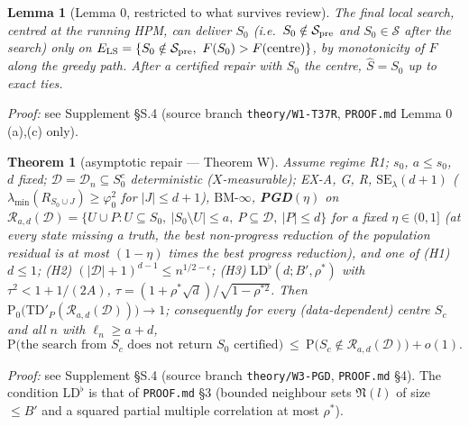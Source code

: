 \documentclass[11pt]{article}
\newtheorem{thmpart}{Theorem}[theorem]
\newtheorem{lemma}{Lemma}
\theoremstyle{definition}
\theoremstyle{remark}
\renewcommand{\Pr}{\mathrm{P}}
\newcommand{\Sz}{S_0}
\newcommand{\Sh}{\widehat S}
\newcommand{\cS}{\mathcal S}
\newcommand{\cR}{\mathcal R}
\begin{document}
\begin{lemma}[Lemma 0, restricted to what survives review]\label{lem:lemma0}
The final local search, centred at the running HPM, can deliver $\Sz$ (i.e.\ $\Sz\notin\cS_{\rm pre}$ and $\Sz\in\cS$ after the search)
only on $E_{\rm LS}=\{\Sz\notin\cS_{\rm pre},\ F(\Sz)>F(\text{centre})\}$, by monotonicity of $F$ along the greedy path.
After a certified repair with $\Sz$ the centre, $\Sh=\Sz$ up to exact ties.
\end{lemma}
\noindent\emph{Proof:} see Supplement \S S.4 (source branch \texttt{theory/W1-T37R}, \texttt{PROOF.md} Lemma 0 (a),(c) only).

\begin{thmpart}[asymptotic repair --- Theorem W]\label{thm:W}
Assume regime R1; $s_0$, $a\le s_0$, $d$ fixed; $\mathcal D=\mathcal D_n\subseteq\Sz^c$ deterministic ($X$-measurable); EX-A, G, R,
$\mathrm{SE}_\lambda(d+1)$ ($\lambda_{\min}(R_{\Sz\cup J})\ge\varphi_0^2$ for $|J|\le d+1$), $\mathrm{BM}\text{-}\infty$, \textbf{PGD}$(\eta)$ on
$\cR_{a,d}(\mathcal D)=\{U\cup P:U\subseteq\Sz,\ |\Sz\setminus U|\le a,\ P\subseteq\mathcal D,\ |P|\le d\}$ for a fixed $\eta\in(0,1]$ (at every state missing a truth,
the best non-progress reduction of the population residual is at most $(1-\eta)$ times the best progress reduction), and one of
(H1) $d\le1$; (H2) $(|\mathcal D|+1)^{d-1}\le n^{1/2-\epsilon}$; (H3) $\mathrm{LD}^\flat(d;B',\rho^*)$ with $\tau^2<1+1/(2A)$,
$\tau=(1+\rho^*\sqrt d)/\sqrt{1-\rho^{*2}}$. Then $\Pr_0\big(\mathrm{TD}'_P(\cR_{a,d}(\mathcal D))\big)\to1$; consequently for every
(data-dependent) centre $S_c$ and all $n$ with $\ell_n\ge a+d$,
\[
\Pr\big(\text{the search from }S_c\text{ does not return }\Sz\text{ certified}\big)\ \le\ \Pr\big(S_c\notin\cR_{a,d}(\mathcal D)\big)+o(1).
\]
\end{thmpart}
\noindent\emph{Proof:} see Supplement \S S.4 (source branch \texttt{theory/W3-PGD}, \texttt{PROOF.md} \S4). The condition $\mathrm{LD}^\flat$ is that
of \texttt{PROOF.md} \S3 (bounded neighbour sets $\mathfrak N(l)$ of size $\le B'$ and a squared partial multiple correlation at most $\rho^*$).
\end{document}
